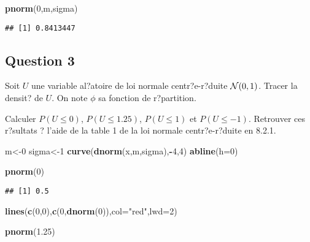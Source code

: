 \documentclass[]{article}
\newenvironment{Shaded}{\begin{snugshade}}{\end{snugshade}}
\newcommand{\DataTypeTok}[1]{\textcolor[rgb]{0.13,0.29,0.53}{#1}}
\newcommand{\DecValTok}[1]{\textcolor[rgb]{0.00,0.00,0.81}{#1}}
\newcommand{\FloatTok}[1]{\textcolor[rgb]{0.00,0.00,0.81}{#1}}
\newcommand{\KeywordTok}[1]{\textcolor[rgb]{0.13,0.29,0.53}{\textbf{#1}}}
\newcommand{\NormalTok}[1]{#1}
\newcommand{\OperatorTok}[1]{\textcolor[rgb]{0.81,0.36,0.00}{\textbf{#1}}}
\newcommand{\StringTok}[1]{\textcolor[rgb]{0.31,0.60,0.02}{#1}}
\begin{document}
\begin{Shaded}
\begin{Highlighting}[]
\KeywordTok{pnorm}\NormalTok{(}\DecValTok{0}\NormalTok{,m,sigma)}
\end{Highlighting}
\end{Shaded}

\begin{verbatim}
## [1] 0.8413447
\end{verbatim}

\hypertarget{question-3}{%
\subsection{Question 3}\label{question-3}}

Soit \(U\) une variable al?atoire de loi normale centr?e-r?duite
\({\cal N}(0,1)\). Tracer la densit? de \(U\). On note \(\phi\) sa
fonction de r?partition.

Calculer \(P(U \leq 0)\), \(P(U \leq 1.25)\), \(P(U \leq 1)\) et
\(P(U \leq -1)\). Retrouver ces r?sultats ? l'aide de la table 1 de la
loi normale centr?e-r?duite en 8.2.1.

\begin{Shaded}
\begin{Highlighting}[]
\NormalTok{m<-}\DecValTok{0}
\NormalTok{sigma<-}\DecValTok{1}
\KeywordTok{curve}\NormalTok{(}\KeywordTok{dnorm}\NormalTok{(x,m,sigma),}\OperatorTok{-}\DecValTok{4}\NormalTok{,}\DecValTok{4}\NormalTok{)}
\KeywordTok{abline}\NormalTok{(}\DataTypeTok{h=}\DecValTok{0}\NormalTok{)}

\KeywordTok{pnorm}\NormalTok{(}\DecValTok{0}\NormalTok{)}
\end{Highlighting}
\end{Shaded}

\begin{verbatim}
## [1] 0.5
\end{verbatim}

\begin{Shaded}
\begin{Highlighting}[]
\KeywordTok{lines}\NormalTok{(}\KeywordTok{c}\NormalTok{(}\DecValTok{0}\NormalTok{,}\DecValTok{0}\NormalTok{),}\KeywordTok{c}\NormalTok{(}\DecValTok{0}\NormalTok{,}\KeywordTok{dnorm}\NormalTok{(}\DecValTok{0}\NormalTok{)),}\DataTypeTok{col=}\StringTok{"red"}\NormalTok{,}\DataTypeTok{lwd=}\DecValTok{2}\NormalTok{)}

\KeywordTok{pnorm}\NormalTok{(}\FloatTok{1.25}\NormalTok{)}
\end{Highlighting}
\end{Shaded}
\end{document}
